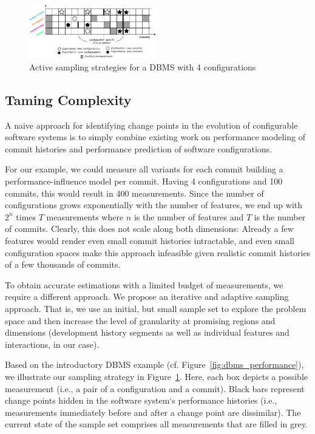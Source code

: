 \documentclass[sigconf, screen]{acmart}
\begin{document}
	\begin{figure}
		\includegraphics[width=0.5\textwidth]{images/sampling_plan}
		
		\caption{Active sampling strategies for a DBMS with 4 configurations}
		\label{fig:sampling plan}
	\end{figure}
	
	\subsection{Taming Complexity}
	A naive approach for identifying change points in the evolution of configurable software systems is to simply combine existing work on performance modeling of commit histories and performance prediction of software configurations.
	
	For our example, we could measure all variants for each commit building a performance-influence model per commit.
	Having 4 configurations and 100 commits, this would result in 400 measurements.
	Since the number of configurations grows exponentially with the number of features, we end up with $2^n$ times $T$ measurements where $n$ is the number of features and $T$ is the number of commits.
	Clearly, this does not scale along both dimensions: Already a few features would render even small commit histories intractable, and even small configuration spaces make this approach infeasible given realistic commit histories of a few thousands of commits.
	
	To obtain accurate estimations with a limited budget of measurements, we require a different approach. We propose an iterative and adaptive sampling approach. That is, we use an initial, but small sample set to explore the problem space and then increase the level of granularity at promising regions and dimensions (development history segments as well as individual features and interactions, in our case). 
	
	Based on the introductory DBMS example (cf. Figure~\ref{fig:dbms_performance}), we illustrate our sampling strategy in Figure~\ref{fig:sampling plan}. Here, each box depicts a possible measurement (i.e., a pair of a configuration and a commit). Black bars represent change points hidden in the software system‘s performance histories (i.e., measurements immediately before and after a change point are dissimilar). The current state of the sample set comprises all measurements that are filled in grey. 
	
\end{document}

